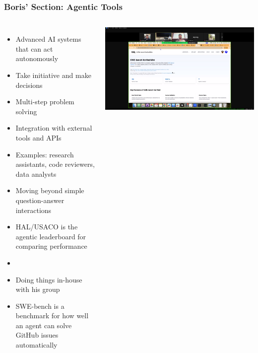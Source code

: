 \documentclass[aspectratio=169]{beamer}
\begin{document}
\begin{frame}
    \frametitle{Boris' Section: Agentic Tools}
    
    \begin{columns}
        \begin{itemize}
            \item Advanced AI systems that can act autonomously
            \item Take initiative and make decisions
            \item Multi-step problem solving
            \item Integration with external tools and APIs
            \item Examples: research assistants, code reviewers, data analysts
            \item Moving beyond simple question-answer interactions
            \item HAL/USACO is the agentic leaderboard for comparing performance
            \item {}
            \item Doing things in-house with his group
            \item SWE-bench is a benchmark for how well an agent can solve GitHub issues automatically
        \end{itemize}
        
        \includegraphics[width=\textwidth]{figures/boris_agentic_screenshot.png}
    \end{columns}
\end{frame}
\end{document}
